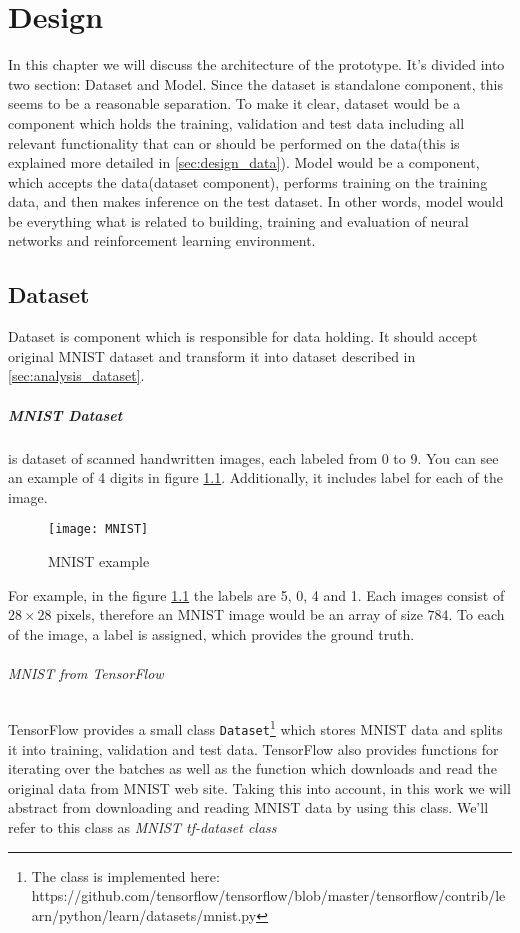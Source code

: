 \chapter{Design}
In this chapter we will discuss the architecture of the prototype.
It's divided into two section: Dataset and Model. Since
the dataset is standalone component, this seems to be
a reasonable separation. To make it clear, dataset would be a component
which holds the training, validation and test data including all relevant
functionality that can or should be performed on the
data(this is explained more detailed in \autoref{sec:design_data}).
Model would be a component, which accepts the data(dataset component), performs
training on the training data, and then makes inference on the test dataset.
In other words, model would be everything what is related to building,
training and evaluation of neural networks and reinforcement learning environment.



\section{Dataset}
\label{sec:design_data}

Dataset is component which is responsible for data holding. It should
accept original MNIST dataset and transform it into dataset described
in \autoref{sec:analysis_dataset}.

\paragraph{MNIST Dataset} is dataset of scanned handwritten images, each labeled
from 0 to 9. You can see an example of 4 digits in figure \ref{fig:mnist}.
Additionally, it includes label for each of the image.

\begin{figure}[h!]
	\texttt{[image: MNIST]}
	\caption{MNIST example}
	\label{fig:mnist}
\end{figure}

For example, in the figure \ref{fig:mnist} the labels are 5, 0, 4 and 1.
Each images consist of $28\times28$ pixels, therefore an MNIST image would
be an array of size $784$. To each of the image, a label is assigned,
which provides the ground truth.

\subparagraph{MNIST from TensorFlow}

TensorFlow provides a small class \lstinline{Dataset}\footnote{
The class is implemented here: https://github.com/tensorflow/tensorflow/blob/master/tensorflow/contrib/learn/python/learn/datasets/mnist.py
} which stores MNIST data and splits it into training,
validation and test data. TensorFlow also provides functions for iterating
over the batches as well as the function which downloads and read
the original data
from MNIST web site. Taking this into account, in this work we will abstract from
downloading and reading MNIST data by using this class. We'll refer
to this class as \emph{MNIST tf-dataset class}


